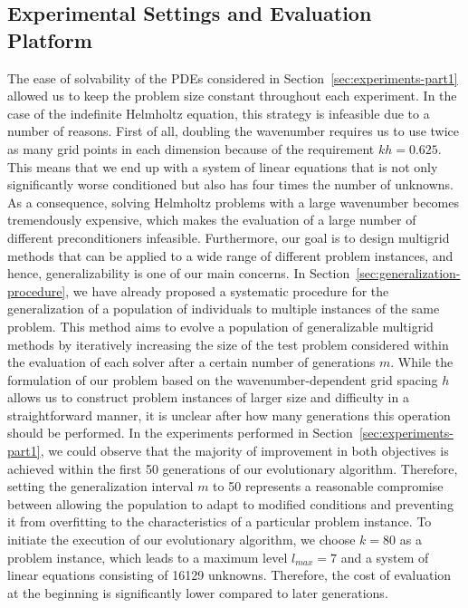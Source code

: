 \subsection{Experimental Settings and Evaluation Platform}
The ease of solvability of the PDEs considered in Section~\ref{sec:experiments-part1} allowed us to keep the problem size constant throughout each experiment.
In the case of the indefinite Helmholtz equation, this strategy is infeasible due to a number of reasons.
First of all, doubling the wavenumber requires us to use twice as many grid points in each dimension because of the requirement $kh = 0.625$.
This means that we end up with a system of linear equations that is not only significantly worse conditioned but also has four times the number of unknowns.
As a consequence, solving Helmholtz problems with a large wavenumber becomes tremendously expensive, which makes the evaluation of a large number of different preconditioners infeasible.
Furthermore, our goal is to design multigrid methods that can be applied to a wide range of different problem instances, and hence, generalizability is one of our main concerns.
In Section~\ref{sec:generalization-procedure}, we have already proposed a systematic procedure for the generalization of a population of individuals to multiple instances of the same problem.
This method aims to evolve a population of generalizable multigrid methods by iteratively increasing the size of the test problem considered within the evaluation of each solver after a certain number of generations $m$.
While the formulation of our problem based on the wavenumber-dependent grid spacing $h$ allows us to construct problem instances of larger size and difficulty in a straightforward manner, it is unclear after how many generations this operation should be performed.
In the experiments performed in Section~\ref{sec:experiments-part1}, we could observe that the majority of improvement in both objectives is achieved within the first 50 generations of our evolutionary algorithm.
Therefore, setting the generalization interval $m$ to 50 represents a reasonable compromise between allowing the population to adapt to modified conditions and preventing it from overfitting to the characteristics of a particular problem instance.
To initiate the execution of our evolutionary algorithm, we choose $k = 80$ as a problem instance, which leads to a maximum level $l_{max} = 7$ and a system of linear equations consisting of 16129 unknowns. 
Therefore, the cost of evaluation at the beginning is significantly lower compared to later generations.

